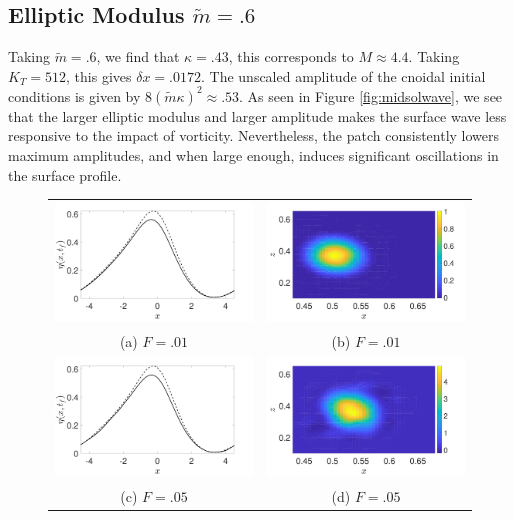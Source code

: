 \documentclass[a4paper,11pt]{article}
\begin{document}
\subsection*{Elliptic Modulus $\tilde{m}=.6$}
Taking $\tilde{m}=.6$, we find that $\kappa = .43$, this corresponds to $M \approx 4.4$.  Taking $K_{T}=512$, this gives $\delta x = .0172$.  The unscaled amplitude of the cnoidal initial conditions is given by $8(\tilde{m}\kappa)^{2}\approx .53$.  As seen in Figure \ref{fig:midsolwave}, we see that the larger elliptic modulus and larger amplitude makes the surface wave less responsive to the impact of vorticity.  Nevertheless, the patch consistently lowers maximum amplitudes, and when large enough, induces significant oscillations in the surface profile.  
\begin{figure}
\centering
\begin{tabular}{cc}
\includegraphics[width=.35\textwidth]{profiles_wm_1_modu_pt6} & \includegraphics[width=.35\textwidth]{vorticity_wm_1_modu_pt6}\\
(a)  $F=.01$ & (b)  $F=.01$\\
\includegraphics[width=.35\textwidth]{profiles_wm_5_modu_pt6} & \includegraphics[width=.35\textwidth]{vorticity_wm_5_modu_pt6}\\
(c)  $F=.05$ & (d)  $F=.05$\\

\end{tabular}
\end{figure}
\end{document}
